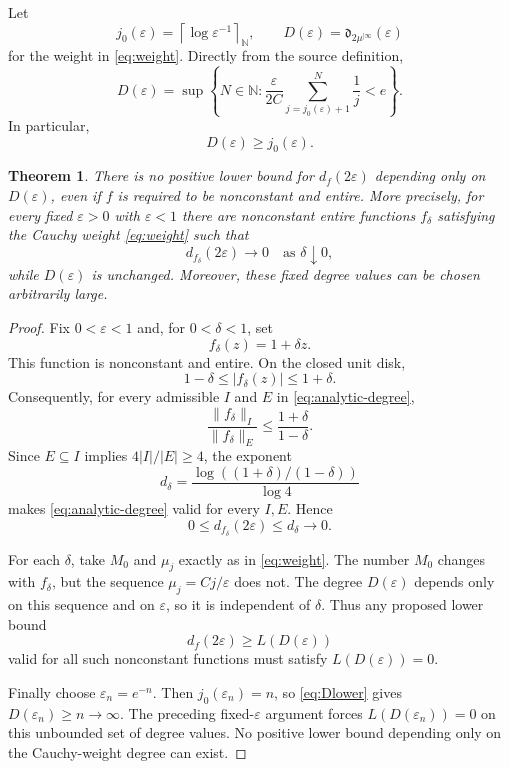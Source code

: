 \documentclass[11pt]{article}
\newtheorem{theorem}{Theorem}
\newcommand{\fd}{\mathfrak d}
\begin{document}
Let
\[
 j_0(\varepsilon)=\left\lceil\log\varepsilon^{-1}\right\rceil_{\mathbb N},
 \qquad
 D(\varepsilon)=\fd_{2\mu^{|\infty}}(\varepsilon)
\]
for the weight in \eqref{eq:weight}.  Directly from the source definition,
\begin{equation}\label{eq:Dformula}
 D(\varepsilon)=\sup\left\{N\in\mathbb N:
 \frac{\varepsilon}{2C}
 \sum_{j=j_0(\varepsilon)+1}^{N}\frac1j<e\right\}.
\end{equation}
In particular,
\begin{equation}\label{eq:Dlower}
 D(\varepsilon)\geq j_0(\varepsilon).
\end{equation}

\begin{theorem}\label{thm:no-lower}
There is no positive lower bound for $d_f(2\varepsilon)$ depending only on
$D(\varepsilon)$, even if $f$ is required to be nonconstant and entire.
More precisely, for every fixed $\varepsilon>0$ with $\varepsilon<1$ there
are nonconstant entire functions $f_\delta$ satisfying the Cauchy weight
\eqref{eq:weight} such that
\[
 d_{f_\delta}(2\varepsilon)\longrightarrow0
 \quad\text{as }\delta\downarrow0,
\]
while $D(\varepsilon)$ is unchanged.  Moreover, these fixed degree values
can be chosen arbitrarily large.
\end{theorem}

\begin{proof}
Fix $0<\varepsilon<1$ and, for $0<\delta<1$, set
\[
 f_\delta(z)=1+\delta z.
\]
This function is nonconstant and entire.  On the closed unit disk,
\[
 1-\delta\leq |f_\delta(z)|\leq1+\delta.
\]
Consequently, for every admissible $I$ and $E$ in
\eqref{eq:analytic-degree},
\[
 \frac{\|f_\delta\|_I}{\|f_\delta\|_E}
 \leq\frac{1+\delta}{1-\delta}.
\]
Since $E\subseteq I$ implies $4|I|/|E|\geq4$, the exponent
\begin{equation}\label{eq:deltabound}
 d_\delta=\frac{\log((1+\delta)/(1-\delta))}{\log4}
\end{equation}
makes \eqref{eq:analytic-degree} valid for every $I,E$.  Hence
\[
 0\leq d_{f_\delta}(2\varepsilon)\leq d_\delta
 \longrightarrow0.
\]

For each $\delta$, take $M_0$ and $\mu_j$ exactly as in
\eqref{eq:weight}.  The number $M_0$ changes with $f_\delta$, but the
sequence $\mu_j=Cj/\varepsilon$ does not.  The degree
$D(\varepsilon)$ depends only on this sequence and on $\varepsilon$, so it
is independent of $\delta$.  Thus any proposed lower bound
\[
 d_f(2\varepsilon)\geq L(D(\varepsilon))
\]
valid for all such nonconstant functions must satisfy
$L(D(\varepsilon))=0$.

Finally choose $\varepsilon_n=e^{-n}$.  Then
$j_0(\varepsilon_n)=n$, so \eqref{eq:Dlower} gives
$D(\varepsilon_n)\geq n\to\infty$.  The preceding fixed-$\varepsilon$
argument forces $L(D(\varepsilon_n))=0$ on this unbounded set of degree
values.  No positive lower bound depending only on the Cauchy-weight degree
can exist.
\end{proof}
\end{document}
